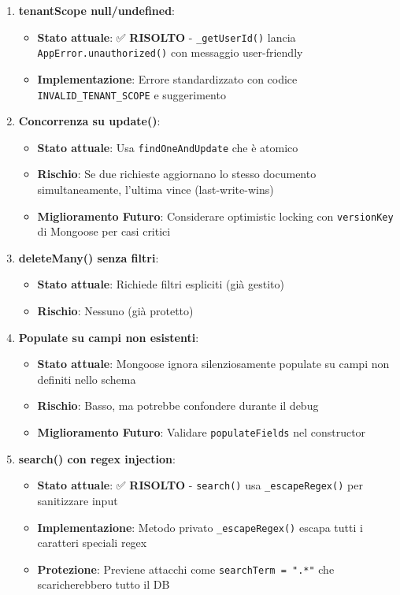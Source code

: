 \documentclass[11pt,a4paper]{article}
\begin{document}
\begin{enumerate}
    \item \textbf{tenantScope null/undefined}:
    \begin{itemize}
        \item \textbf{Stato attuale}: ✅ \textbf{RISOLTO} - \texttt{\_getUserId()} lancia \texttt{AppError.unauthorized()} con messaggio user-friendly
        \item \textbf{Implementazione}: Errore standardizzato con codice \texttt{INVALID\_TENANT\_SCOPE} e suggerimento
    \end{itemize}
    
    \item \textbf{Concorrenza su update()}:
    \begin{itemize}
        \item \textbf{Stato attuale}: Usa \texttt{findOneAndUpdate} che è atomico
        \item \textbf{Rischio}: Se due richieste aggiornano lo stesso documento simultaneamente, l'ultima vince (last-write-wins)
        \item \textbf{Miglioramento Futuro}: Considerare optimistic locking con \texttt{versionKey} di Mongoose per casi critici
    \end{itemize}
    
    \item \textbf{deleteMany() senza filtri}:
    \begin{itemize}
        \item \textbf{Stato attuale}: Richiede filtri espliciti (già gestito)
        \item \textbf{Rischio}: Nessuno (già protetto)
    \end{itemize}
    
    \item \textbf{Populate su campi non esistenti}:
    \begin{itemize}
        \item \textbf{Stato attuale}: Mongoose ignora silenziosamente populate su campi non definiti nello schema
        \item \textbf{Rischio}: Basso, ma potrebbe confondere durante il debug
        \item \textbf{Miglioramento Futuro}: Validare \texttt{populateFields} nel constructor
    \end{itemize}
    
    \item \textbf{search() con regex injection}:
    \begin{itemize}
        \item \textbf{Stato attuale}: ✅ \textbf{RISOLTO} - \texttt{search()} usa \texttt{\_escapeRegex()} per sanitizzare input
        \item \textbf{Implementazione}: Metodo privato \texttt{\_escapeRegex()} escapa tutti i caratteri speciali regex
        \item \textbf{Protezione}: Previene attacchi come \texttt{searchTerm = ".*"} che scaricherebbero tutto il DB
    \end{itemize}
    

\end{enumerate}
\end{document}
